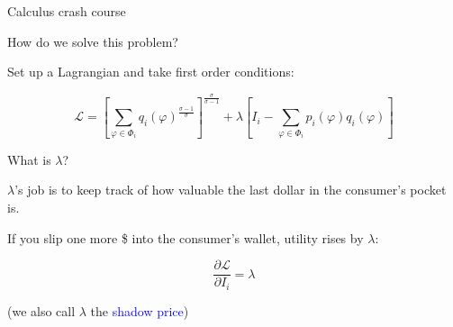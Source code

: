 \documentclass[notes,11pt, aspectratio=169, xcolor=table]{beamer}
\newcommand{\blue}[1]{\textcolor{blue}{#1}}
\newenvironment{wideitemize}{\itemize\addtolength{\itemsep}{10pt}}{\enditemize}
\begin{document}
\begin{frame}{Calculus crash course}

\begin{wideitemize}
    \item How do we solve this problem? 
    \item<2-> Set up a Lagrangian and take first order conditions:

    \begin{equation*}
    \mathcal{L} = \left[ \sum_{\varphi \in \Phi_i } q_i(
    \varphi)^{\tfrac{\sigma-1}{\sigma}} \right]^{\tfrac{\sigma}{\sigma-1} } + \lambda \left[ I_i - \sum_{\varphi \in \Phi_i } p_i(\varphi) q_i(\varphi) \right]
\end{equation*}

    \item<3-> What is $\lambda$?

    \item<4-> $\lambda$'s job is to keep track of how valuable the last dollar in the consumer’s pocket is.
    
    \item<5-> If you slip one more \$ into the consumer’s wallet, utility rises by $\lambda$:

    \begin{equation*}
        \frac{\partial \mathcal{L}}{\partial I_i} = \lambda
    \end{equation*}

    \qquad (we also call $\lambda$ the \blue{shadow price}) 
    
\end{wideitemize}
    
\end{frame}
\end{document}
